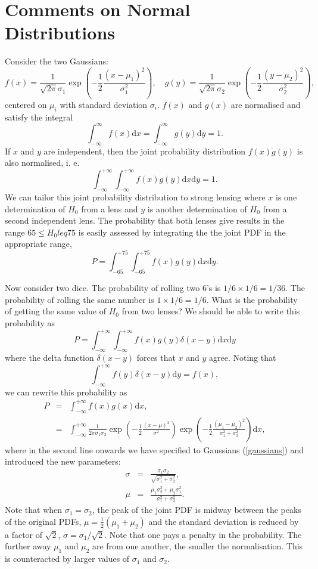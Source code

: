 \documentclass[aps,prl,10pt,twocolumn,superscriptaddress]{revtex4}
\def\be{\begin{equation}}
\def\ee{\end{equation}}
\def\bea{\begin{eqnarray}}
\def\eea{\end{eqnarray}}
\newcommand{\dd}{\textrm{d}}
\newcommand{\nn}{\nonumber \\}
\begin{document}
\section{Comments on Normal Distributions}
Consider the two Gaussians:
\be
\label{gaussians}
f(x) = \frac{1}{\sqrt{2 \pi} \sigma_1} \exp \left( -\frac{1}{2} \frac{(x - \mu_1)^2}{\sigma_1^2} \right), \quad g(y) = \frac{1}{\sqrt{2 \pi} \sigma_2} \exp \left( -\frac{1}{2} \frac{(y - \mu_2)^2}{\sigma_2^2} \right),  
\ee
centered on $\mu_i$ with standard deviation $\sigma_i$. 
$f(x)$ and $g(x)$ are normalised and satisfy the integral
\be
\int_{-\infty}^{\infty} f(x) \dd x = \int_{-\infty}^{\infty} g(y) \dd y =  1. 
\ee
If $x$ and $y$ are independent, then the joint probability distribution $f(x) \dot g(y)$ is also normalised, i. e. 
\be
\int_{-\infty}^{+\infty} \int_{-\infty}^{+\infty} f(x) g(y) \dd x \dd y = 1. 
\ee
We can tailor this joint probability distribution to strong lensing where $x$ is one determination of $H_0$ from a lens and $y$ is another determination of $H_0$ from a second independent lens. The probability that both lenses give results in the range $65 \leq H_0 leq 75$ is easily assessed by integrating the the joint PDF in the appropriate range, 
\be
P = \int_{-65}^{+75} \int_{-65}^{+75} f(x) g(y) \dd x \dd y. 
\ee



Now consider two dice. The probability of rolling two 6's is $1/6 \times 1/6 = 1/36$. The probability of rolling the same number is $1 \times 1/6 = 1/6$. What is the probability of getting the same value of $H_0$ from two lenses? We should be able to write this probability as 
\be
P = \int_{-\infty}^{+\infty} \int_{-\infty}^{+\infty} f(x) g(y) \delta (x-y) \dd x \dd y
\ee
where the delta function $\delta(x-y)$ forces that $x$ and $y$ agree. Noting that
\be
\int_{-\infty}^{+\infty} f(y) \delta (x-y) \dd y  = f(x), 
\ee
we can rewrite this probability as 
\bea
\label{product}
P &=& \int_{-\infty}^{+\infty} f(x) g(x) \dd x,  \nn
&=& \int_{-\infty}^{+\infty} \frac{1}{2 \pi \sigma_1 \sigma_2 } \exp \left( -\frac{1}{2} \frac{(x- \mu)^2}{\sigma^2} \right) \exp \left( - \frac{1}{2} \frac{(\mu_1-\mu_2)^2}{\sigma_1^2 + \sigma_2^2} \right) \dd x, 
\eea
where in the second line onwards we have specified to Gaussians (\ref{gaussians}) and introduced the new parameters: 
\bea
\sigma &=& \frac{\sigma_1 \sigma_2}{\sqrt{\sigma_1^2+\sigma_2^2}}, \nn
\mu &=& \frac{\mu_1 \sigma_2^2 + \mu_2 \sigma_1^2}{\sigma_1^2 + \sigma_2^2}. 
\eea
Note that when $\sigma_1 = \sigma_2$, the peak of the joint PDF is midway between the peaks of the original PDFs, $\mu = \frac{1}{2} (\mu_1 + \mu_2)$ and the standard deviation is reduced by a factor of $\sqrt{2}$, $\sigma = \sigma_1/\sqrt{2}$. Note that one pays a penalty in the probability. The further away $\mu_1$ and $\mu_2$ are from one another, the smaller the normalisation. This is counteracted by larger values of $\sigma_1$ and $\sigma_2$.   
\end{document}
